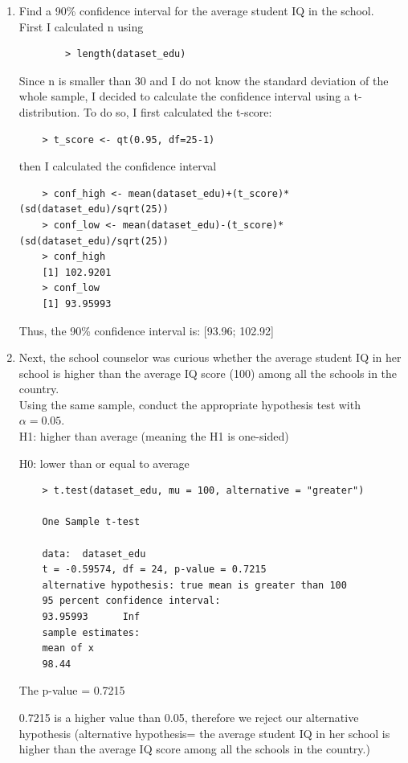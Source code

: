 \documentclass[12pt,letterpaper]{article}
\begin{document}
\vspace{1cm}
\begin{enumerate}
	\item Find a 90\% confidence interval for the average student IQ in the school.\\
	
	First I calculated n using 
	\begin{verbatim}
		> length(dataset_edu)
	\end{verbatim}
	
	Since n is smaller than 30 and I do not know the standard deviation of the whole sample, I decided to calculate the confidence interval using a t-distribution. To do so, I first calculated the t-score:
\begin{verbatim}
	> t_score <- qt(0.95, df=25-1)
		\end{verbatim}

	then I calculated the confidence interval
	\begin{verbatim}
	> conf_high <- mean(dataset_edu)+(t_score)*(sd(dataset_edu)/sqrt(25))
	> conf_low <- mean(dataset_edu)-(t_score)*(sd(dataset_edu)/sqrt(25))
	> conf_high
	[1] 102.9201
	> conf_low
	[1] 93.95993
		\end{verbatim}
	Thus, the 90\% confidence interval is: [93.96; 102.92]
	
	\item Next, the school counselor was curious  whether  the average student IQ in her school is higher than the average IQ score (100) among all the schools in the country.\\ 
	
	\noindent Using the same sample, conduct the appropriate hypothesis test with $\alpha=0.05$.\\ 
	
	H1: higher than average (meaning the H1 is one-sided)
	
	H0: lower than or equal to average 
		\begin{verbatim}
	> t.test(dataset_edu, mu = 100, alternative = "greater")
	
	One Sample t-test
	
	data:  dataset_edu
	t = -0.59574, df = 24, p-value = 0.7215
	alternative hypothesis: true mean is greater than 100
	95 percent confidence interval:
	93.95993      Inf
	sample estimates:
	mean of x 
	98.44 
		\end{verbatim}
	
	The p-value = 0.7215
	
	0.7215 is a higher value than 0.05, therefore we reject our alternative hypothesis (alternative hypothesis= the average student IQ in her school is higher than the average IQ score among all the schools in the country.)
\end{enumerate}
\end{document}
